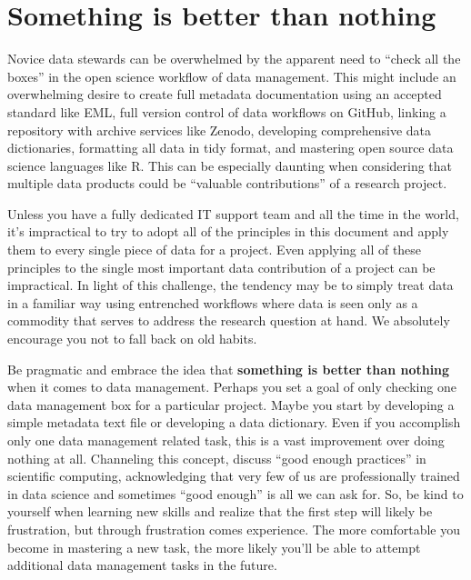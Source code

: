 \documentclass[
]{book}
\begin{document}
\hypertarget{something-is-better-than-nothing}{%
\section{Something is better than nothing}\label{something-is-better-than-nothing}}

Novice data stewards can be overwhelmed by the apparent need to ``check all the boxes'' in the open science workflow of data management. This might include an overwhelming desire to create full metadata documentation using an accepted standard like EML, full version control of data workflows on GitHub, linking a repository with archive services like Zenodo, developing comprehensive data dictionaries, formatting all data in tidy format, and mastering open source data science languages like R. This can be especially daunting when considering that multiple data products could be ``valuable contributions'' of a research project.

Unless you have a fully dedicated IT support team and all the time in the world, it's impractical to try to adopt all of the principles in this document and apply them to every single piece of data for a project. Even applying all of these principles to the single most important data contribution of a project can be impractical. In light of this challenge, the tendency may be to simply treat data in a familiar way using entrenched workflows where data is seen only as a commodity that serves to address the research question at hand. We absolutely encourage you not to fall back on old habits.

Be pragmatic and embrace the idea that \textbf{something is better than nothing} when it comes to data management. Perhaps you set a goal of only checking one data management box for a particular project. Maybe you start by developing a simple metadata text file or developing a data dictionary. Even if you accomplish only one data management related task, this is a vast improvement over doing nothing at all. Channeling this concept, \citet{Wilson17} discuss ``good enough practices'' in scientific computing, acknowledging that very few of us are professionally trained in data science and sometimes ``good enough'' is all we can ask for. So, be kind to yourself when learning new skills and realize that the first step will likely be frustration, but through frustration comes experience. The more comfortable you become in mastering a new task, the more likely you'll be able to attempt additional data management tasks in the future.
\end{document}
